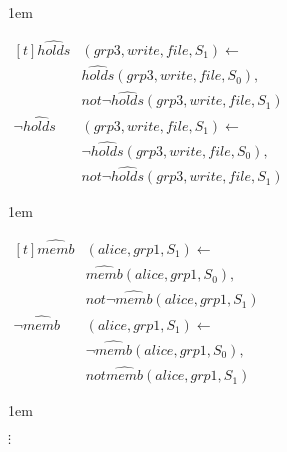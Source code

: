 \documentclass[global,twocolumn,final]{svjour}
\newenvironment{vexample}
  {\begin{example}\hspace{0.25em}}
  {\end{example}}
\newenvironment{vquote}
  {\begin{list}{}{\leftmargin 1em}\item[]}
  {\end{list}}
\begin{document}
\begin{vexample}
\begin{enumerate}
              \begin{vquote}
                \begin{math}
                  \begin{aligned}[t]
                    \hat{holds}&(grp3, write, file, S_{1}) \leftarrow \\
                    & \hat{holds}(grp3, write, file, S_{0}), \\
                    & not \lnot \hat{holds}(grp3, write, file, S_{1}) \\
                    \lnot \hat{holds}&(grp3, write, file, S_{1}) \leftarrow \\
                    & \lnot \hat{holds}(grp3, write, file, S_{0}), \\
                    & not \lnot \hat{holds}(grp3, write, file, S_{1})
                  \end{aligned}
                \end{math}
              \end{vquote}

              \begin{vquote}
                \begin{math}
                  \begin{aligned}[t]
                    \hat{memb}&(alice, grp1, S_{1}) \leftarrow \\
                    & \hat{memb}(alice, grp1, S_{0}), \\
                    & not \lnot \hat{memb}(alice, grp1, S_{1}) \\
                    \lnot \hat{memb}&(alice, grp1, S_{1}) \leftarrow \\
                    & \lnot \hat{memb}(alice, grp1, S_{0}), \\
                    & not \hat{memb}(alice, grp1, S_{1})
                  \end{aligned}
                \end{math}
              \end{vquote}

              \begin{vquote}
                \hspace{5em}$\vdots$
              \end{vquote}


\end{enumerate}
\end{vexample}
\end{document}
